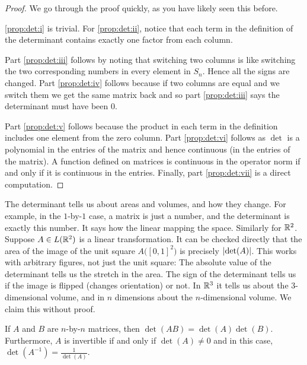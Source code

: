 \begin{proof}
We go through the proof quickly, as you have likely seen this before.

\ref{prop:det:i} is trivial.  For \ref{prop:det:ii}, notice that each term in the definition of the
determinant contains exactly one factor from each column.

Part \ref{prop:det:iii} follows by noting that switching two columns is like switching the
two corresponding numbers in every element in $S_n$.  Hence all the signs
are changed.
Part \ref{prop:det:iv} follows because if two columns are equal and we switch them we get
the same matrix back and so part \ref{prop:det:iii} says the determinant must have been
0.

Part \ref{prop:det:v} follows because the product in each term in the definition includes
one element from the zero column.
Part \ref{prop:det:vi} follows as $\det$ is a polynomial in the entries of the matrix
and hence continuous (in the entries of the matrix).  A function defined on
matrices is continuous in the operator norm if and only if it is 
continuous in the entries.
Finally, part \ref{prop:det:vii} is a direct computation.
\end{proof}

The determinant tells us about areas and volumes, and how they change.
For example, in the $1$-by-$1$ case, a matrix is just a number, and the
determinant is exactly this number.  It says how the linear mapping
 the space.  Similarly for ${\mathbb{R}}^2$.
Suppose $A \in L({\mathbb{R}}^2)$ is a linear transformation.
It can be checked directly that
the area of the image of the unit square $A\bigl([0,1]^2\bigr)$ is precisely
$\lvert {\det(A)} \rvert$.
This works with arbitrary figures, not just the unit
square:
The absolute value of the determinant tells us the stretch in the area.
The sign of the determinant tells us if the image is
flipped (changes orientation) or not.
In ${\mathbb{R}}^3$ it
tells us about the 3-dimensional volume, and in $n$ dimensions about the
$n$-dimensional volume.  We claim this without proof.

\begin{prop}
If $A$ and $B$ are $n$-by-$n$ matrices, then $\det(AB) = \det(A)\det(B)$.
Furthermore, $A$ is invertible if and only if $\det(A) \not= 0$ and in
this case, $\det(A^{-1}) = \frac{1}{\det(A)}$.
\end{prop}


